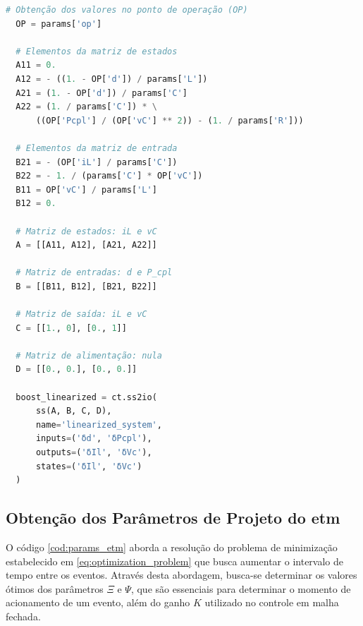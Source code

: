 \vspace{8pt}
\begin{lstlisting}[language=Python, caption={Implementação do conversor Boost linearizado.}, label=cod:boost_linear]
  # Obtenção dos valores no ponto de operação (OP)
  OP = params['op']
  
  # Elementos da matriz de estados
  A11 = 0.
  A12 = - ((1. - OP['d']) / params['L'])
  A21 = (1. - OP['d']) / params['C']
  A22 = (1. / params['C']) * \
      ((OP['Pcpl'] / (OP['vC'] ** 2)) - (1. / params['R']))
  
  # Elementos da matriz de entrada
  B21 = - (OP['iL'] / params['C'])
  B22 = - 1. / (params['C'] * OP['vC'])
  B11 = OP['vC'] / params['L']
  B12 = 0.
  
  # Matriz de estados: iL e vC
  A = [[A11, A12], [A21, A22]]
  
  # Matriz de entradas: d e P_cpl
  B = [[B11, B12], [B21, B22]]
  
  # Matriz de saída: iL e vC
  C = [[1., 0], [0., 1]]
  
  # Matriz de alimentação: nula
  D = [[0., 0.], [0., 0.]]
  
  boost_linearized = ct.ss2io(
      ss(A, B, C, D),
      name='linearized_system',
      inputs=('δd', 'δPcpl'),
      outputs=('δIl', 'δVc'),
      states=('δIl', 'δVc')
  )
\end{lstlisting}

\subsection{Obtenção dos Parâmetros de Projeto do \acrshort{etm}}

O código \ref{cod:params_etm} aborda a resolução do problema de minimização estabelecido em \eqref{eq:optimization_problem} que busca aumentar o intervalo de tempo entre os eventos. Através desta abordagem, busca-se determinar os valores ótimos dos parâmetros $\Xi$ e $\Psi$, que são essenciais para determinar o momento de acionamento de um evento, além do ganho $K$ utilizado no controle em malha fechada.

